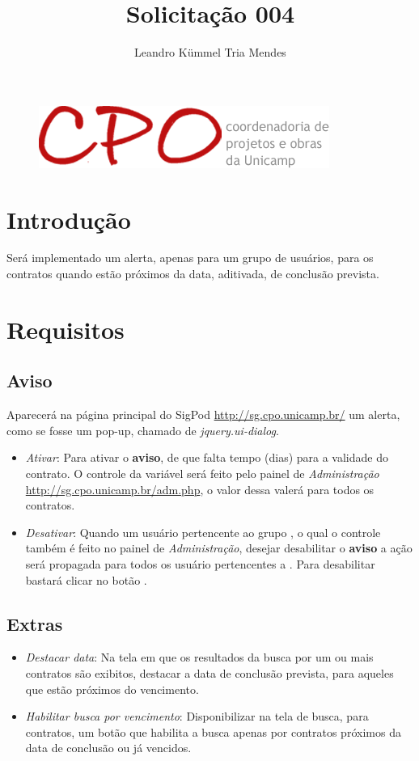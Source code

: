 \documentclass[a4paper,10pt]{article}
\title{Solicitação 004}
\author{Leandro Kümmel Tria Mendes}
\begin{document}
\maketitle
\begin{figure}[!htb]
  \centering
  \includegraphics[scale=0.5]{logo.png}
\end{figure}
\newpage
\section{Introdução}
Será implementado um alerta, apenas para um grupo de usuários, para os contratos quando estão próximos da data, aditivada, de conclusão prevista.
\section{Requisitos}
\subsection{Aviso}
Aparecerá na página principal do SigPod \url{http://sg.cpo.unicamp.br/} um alerta, como se fosse um pop-up, chamado de \emph{jquery.ui-dialog}.
\begin{itemize}
\item \emph{Ativar}: Para ativar o \textbf{aviso}, de que falta  tempo (dias) para a validade do contrato. O controle da variável  será feito pelo painel de \emph{Administração}
\url{http://sg.cpo.unicamp.br/adm.php}, o valor dessa valerá para todos os contratos.
\item \emph{Desativar}: Quando um usuário pertencente ao grupo , o qual o controle também é feito no painel de \emph{Administração}, desejar desabilitar o \textbf{aviso} a ação será
propagada para todos os usuário pertencentes a . Para desabilitar bastará clicar no botão \boxed{[Desabilitar]}.
\end{itemize}
\subsection{Extras}
\begin{itemize}
\item \emph{Destacar data}: Na tela em que os resultados da busca por um ou mais contratos são exibitos, destacar a data de conclusão prevista, para aqueles que estão próximos do vencimento.
\item \emph{Habilitar busca por vencimento}:  Disponibilizar na tela de busca, para contratos, um botão que habilita a busca apenas por contratos próximos da data de conclusão ou já vencidos.
\end{itemize}
\end{document}
